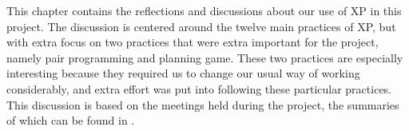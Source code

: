 This chapter contains the reflections and discussions about our use of XP in this project. The discussion is centered around the twelve main practices of XP, but with extra focus on two practices that were extra important for the project, namely pair programming and planning game. These two practices are especially interesting because they required us to change our usual way of working considerably, and extra effort was put into following these particular practices. This discussion is based on the meetings held during the project, the summaries of which can be found in .